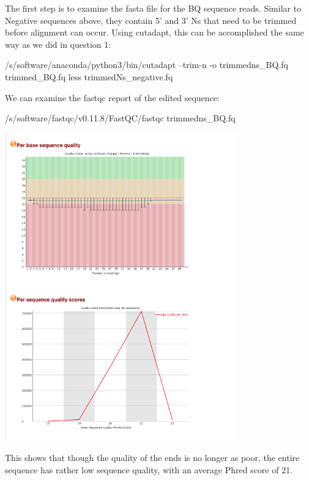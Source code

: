 \documentclass[]{article}
\newenvironment{Shaded}{\begin{snugshade}}{\end{snugshade}}
\newcommand{\FunctionTok}[1]{\textcolor[rgb]{0.00,0.00,0.00}{#1}}
\newcommand{\ExtensionTok}[1]{#1}
\newcommand{\NormalTok}[1]{#1}
\begin{document}
The first step is to examine the fasta file for the BQ sequence reads.
Similar to Negative sequences above, they contain 5' and 3' Ns that need
to be trimmed before alignment can occur. Using cutadapt, this can be
accomplished the same way as we did in question 1:

\begin{Shaded}
\begin{Highlighting}[]
\ExtensionTok{/s/software/anaconda/python3/bin/cutadapt}\NormalTok{ --trim-n -o trimmedns_BQ.fq trimmed_BQ.fq}
\FunctionTok{less}\NormalTok{ trimmedNs_negative.fq}
\end{Highlighting}
\end{Shaded}

We can examine the fastqc report of the edited sequence:

\begin{Shaded}
\begin{Highlighting}[]
\ExtensionTok{/s/software/fastqc/v0.11.8/FastQC/fastqc}\NormalTok{ trimmedns_BQ.fq}
\end{Highlighting}
\end{Shaded}

\includegraphics[width=0.75000\textwidth]{trimmedns_BQ_fastqc.png}

This shows that though the quality of the ends is no longer as poor, the
entire sequence has rather low sequence quality, with an average Phred
score of 21.
\end{document}
